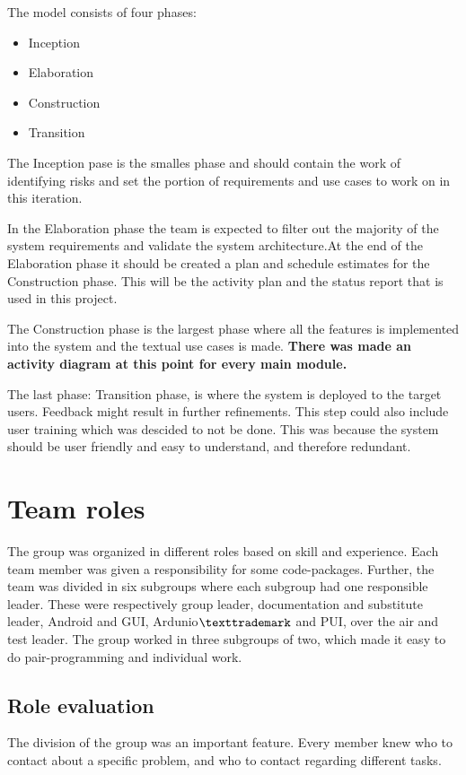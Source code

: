 The model consists of four phases:

\begin{itemize}
\item{Inception}
\item{Elaboration}
\item{Construction}
\item{Transition}
\end{itemize}

The Inception pase is the smalles phase and should contain the work of identifying risks and set the portion of requirements and use cases to work on in this iteration.

In the Elaboration phase the team is expected to filter out the majority of the system requirements and validate the system architecture.At the end of the Elaboration phase it should be created a plan and schedule estimates for the Construction phase. This will be the activity plan and the status report that is used in this project. 

The Construction phase is the largest phase where all the features is implemented into the system and the textual use cases is made.
\textbf{There was made an activity diagram at this point for every main module.}

The last phase: Transition phase, is where the system is deployed to the target users. Feedback might result in further refinements. This step could also include user training which was descided to not be done. This was because the system should be user friendly and easy to understand, and therefore redundant.

\section{Team roles}
The group was organized in different roles based on skill and experience. Each team member was given a responsibility for some code-packages. Further, the team was divided in six subgroups where each subgroup had one responsible leader. These were respectively group leader, documentation and substitute leader, Android and GUI, Ardunio$\texttrademark$ and PUI, over the air and test leader. The group worked in three subgroups of two, which made it easy to do pair-programming and individual work.

\subsection{Role evaluation}
The division of the group was an important feature. Every member knew who to contact about a specific problem, and who to contact regarding different tasks.\\


